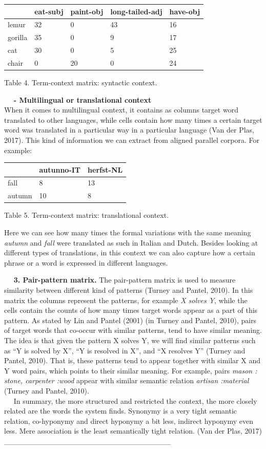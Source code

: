 \documentclass[11pt]{article}
\begin{document}
\begin{longtable}[]{@{}lllll@{}}
\toprule
& eat-subj & paint-obj & long-tailed-adj & have-obj\tabularnewline
\midrule
\endhead
lemur & 32 & 0 & 43 & 16\tabularnewline
gorilla & 35 & 0 & 9 & 17\tabularnewline
cat & 30 & 0 & 5 & 25\tabularnewline
chair & 0 & 20 & 0 & 24\tabularnewline
\bottomrule
\end{longtable}

Table 4. Term-context matrix: syntactic context.

    \textbf{- Multilingual or translational context}\\
When it comes to multilingual context, it contains as columns target
word translated to other languages, while cells contain how many times a
certain target word was translated in a particular way in a particular
language (Van der Plas, 2017). This kind of information we can extract
from aligned parallel corpora. For example:

\begin{longtable}[]{@{}lll@{}}
\toprule
& autunno-IT & herfst-NL\tabularnewline
\midrule
\endhead
fall & 8 & 13\tabularnewline
autumn & 10 & 8\tabularnewline
\bottomrule
\end{longtable}

Table 5. Term-context matrix: translational context.

Here we can see how many times the formal variations with the same
meaning \emph{autumn} and \emph{fall} were translated as such in Italian
and Dutch. Besides looking at different types of translations, in this
context we can also capture how a certain phrase or a word is expressed
in different languages.

   \textbf{3. Pair-pattern matrix.} The pair-pattern matrix is used to
measure similarity between different kind of patterns (Turney and
Pantel, 2010). In this matrix the columns represent the patterns, for
example \emph{X solves Y}, while the cells contain the counts of how
many times target words appear as a part of this pattern. As stated by
Lin and Pantel (2001) (in Turney and Pantel, 2010), pairs of target
words that co-occur with similar patterns, tend to have similar meaning.
The idea is that given the pattern X solves Y, we will find similar
patterns such as ``Y is solved by X'', ``Y is resolved in X'', and ``X
resolves Y'' (Turney and Pantel, 2010). That is, these patterns tend to
appear together with similar X and Y word pairs, which points to their
similar meaning. For example, pairs \emph{mason : stone, carpenter
:wood} appear with similar semantic relation \emph{artisan :material}
(Turney and Pantel, 2010).\\
    In summary, the more structured and restricted the context, the more
closely related are the words the system finds. Synonymy is a very tight
semantic relation, co-hyponymy and direct hyponymy a bit less, indirect
hyponymy even less. Mere association is the least semantically tight
relation. (Van der Plas, 2017)
\_\_\_\_\_\_\_\_\_\_\_\_\_\_\_\_\_\_\_\_\_\_\_\_\_\_\_\_\_\_\_
\end{document}
